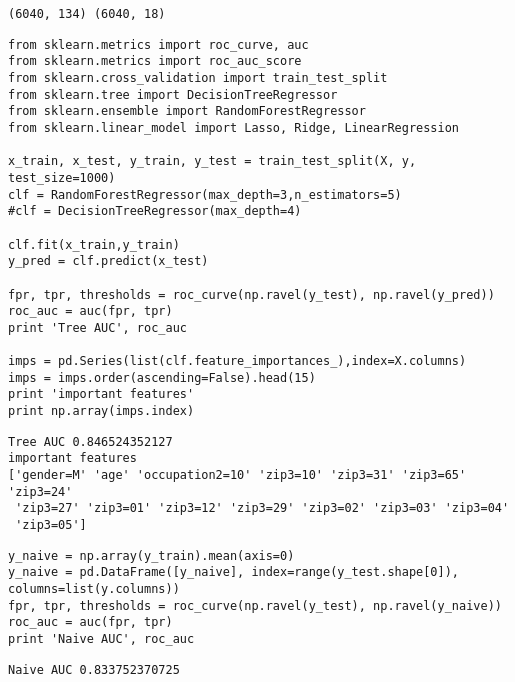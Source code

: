 \documentclass[12pt,fleqn]{article}\usepackage{../common}
\begin{document}
\begin{verbatim}
(6040, 134) (6040, 18)
\end{verbatim}

\begin{verbatim}
from sklearn.metrics import roc_curve, auc
from sklearn.metrics import roc_auc_score
from sklearn.cross_validation import train_test_split
from sklearn.tree import DecisionTreeRegressor
from sklearn.ensemble import RandomForestRegressor
from sklearn.linear_model import Lasso, Ridge, LinearRegression

x_train, x_test, y_train, y_test = train_test_split(X, y, test_size=1000)
clf = RandomForestRegressor(max_depth=3,n_estimators=5)
#clf = DecisionTreeRegressor(max_depth=4)

clf.fit(x_train,y_train)
y_pred = clf.predict(x_test)

fpr, tpr, thresholds = roc_curve(np.ravel(y_test), np.ravel(y_pred))
roc_auc = auc(fpr, tpr)
print 'Tree AUC', roc_auc

imps = pd.Series(list(clf.feature_importances_),index=X.columns)
imps = imps.order(ascending=False).head(15)
print 'important features'
print np.array(imps.index)
\end{verbatim}

\begin{verbatim}
Tree AUC 0.846524352127
important features
['gender=M' 'age' 'occupation2=10' 'zip3=10' 'zip3=31' 'zip3=65' 'zip3=24'
 'zip3=27' 'zip3=01' 'zip3=12' 'zip3=29' 'zip3=02' 'zip3=03' 'zip3=04'
 'zip3=05']
\end{verbatim}

\begin{verbatim}
y_naive = np.array(y_train).mean(axis=0)
y_naive = pd.DataFrame([y_naive], index=range(y_test.shape[0]), columns=list(y.columns))
fpr, tpr, thresholds = roc_curve(np.ravel(y_test), np.ravel(y_naive))
roc_auc = auc(fpr, tpr)
print 'Naive AUC', roc_auc
\end{verbatim}

\begin{verbatim}
Naive AUC 0.833752370725
\end{verbatim}
\end{document}
